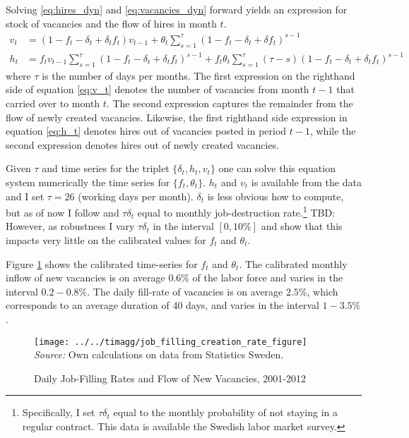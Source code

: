 Solving \eqref{eq:hires_dyn} and \eqref{eq:vacancies_dyn} forward yields an expression for stock of vacancies and the flow of hires in month $t$.
\begin{align}
v_t&=\left( 1-f_t-\delta_t+\delta_t f_t \right) v_{t-1} + \theta_t \sum_{s=1}^{\tau} \left( 1-f_t-\delta_t+\delta f_t \right)^{s-1}  \label{eq:v_t} \\
h_t&=f_t v_{t-1} \sum_{s=1}^{\tau} \left( 1-f_t-\delta_t+\delta_t f_t \right)^{s-1} + f_t \theta_t \sum_{s=1}^{\tau} \left( \tau- s\right) \left( 1-f_t-\delta_t+\delta_t f_t \right)^{s-1} \label{eq:h_t}
\end{align}
where $\tau$ is the number of days per months. The first expression on the righthand side of equation \eqref{eq:v_t} denotes the number of vacancies from month $t-1$ that carried over to month $t$. The second expression captures the remainder from the flow of newly created vacancies. Likewise, the first righthand side expression in equation \eqref{eq:h_t} denotes hires out of vacancies posted in period $t-1$, while the second expression denotes hires out of newly created vacancies. 

Given $\tau$ and time series for the triplet $\{\delta_t, h_t, v_t \}$ one can solve this equation system numerically the time series for $\{ f_t, \theta_t \}$. $h_t$ and $v_t$ is available from the data and I set $\tau=26$ (working days per month). $\delta_t$ is less obvious how to compute, but as of now I follow \cite{Davis2013} and $\tau \delta_t$ equal to monthly job-destruction rate.\footnote{Specifically, I set $\tau \delta_t$ equal to the monthly probability of not staying in a regular contract. This data is available the Swedish labor market survey.} TBD: However, as robustness I vary $\tau \delta_t$ in the interval $[0,10\%]$ and show that this impacts very little on the calibrated values for $f_t$ and $\theta_t$.

Figure \ref{fig:filling_rates} shows the calibrated time-series for $f_t$ and $\theta_t$. The calibrated monthly inflow of new vacancies is on average $0.6 \%$ of the labor force and varies in the interval $0.2-0.8 \%$. The daily fill-rate of vacancies is on average $2.5 \%$, which corresponds to an average duration of 40 days, and varies in the interval $1-3.5\%$. 

\begin{figure}[t]
\centering
\caption{Daily Job-Filling Rates and Flow of New Vacancies, 2001-2012}
\texttt{[image: ../../timagg/job\_filling\_creation\_rate\_figure]}
\flushleft
\footnotesize{\emph{Source:} Own calculations on data from Statistics Sweden.}
\label{fig:filling_rates}
\end{figure}

